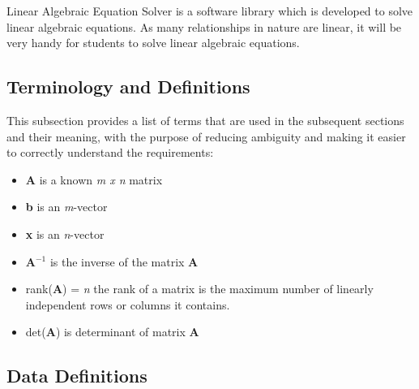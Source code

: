 \documentclass[12pt]{article}
\newcommand{\progname}{Linear Algebraic Equation Solver} %
\begin{document}
\progname{} is a software library which is developed to solve linear algebraic
equations. As many relationships in nature are linear, it will be very handy for
students to solve linear algebraic equations.

\subsection{Terminology and  Definitions}

This subsection provides a list of terms that are used in the subsequent
sections and their meaning, with the purpose of reducing ambiguity and making it
easier to correctly understand the requirements:




\begin{itemize}

\item \textbf{A} is a known \textit{m x n} matrix 

\item \textbf{b} is an \textit{m}-vector 

\item \textbf{x} is an \textit{n}-vector

\item \textbf{A$^{-1}$} is the inverse of the matrix \textbf{A}

\item rank(\textbf{A}) = \textit{n} the rank of a matrix is the maximum number
of linearly independent rows or columns it contains.

\item det(\textbf{A}) is determinant of matrix \textbf{A}


\end{itemize}

\pagebreak

\subsection{Data Definitions} \label{sec_datadef}

~\newline
\end{document}

